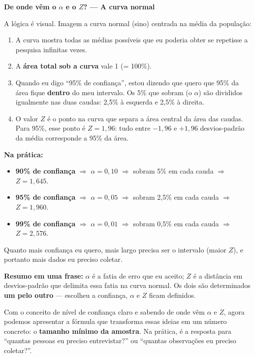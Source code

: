 \begin{SolvedBox}
\textbf{De onde vêm o $\alpha$ e o $Z$? --- A curva normal}

A lógica é visual.
Imagem a curva normal (sino) centrada na média da população:

\begin{enumerate}
  \item A curva mostra todas as médias possíveis que eu poderia obter
  se repetisse a pesquisa infinitas vezes.
  \item A \textbf{área total sob a curva} vale 1 (= 100\%).
  \item Quando eu digo ``95\% de confiança'', estou dizendo que quero
  que 95\% da área fique \textbf{dentro} do meu intervalo. Os 5\% que
  sobram (o $\alpha$) são divididos igualmente nas duas caudas:
  2{,}5\% à esquerda e 2{,}5\% à direita.
  \item O valor \textbf{$Z$} é o ponto na curva que separa a área
  central da área das caudas. Para 95\%, esse ponto é $Z = 1{,}96$:
  tudo entre $-1{,}96$ e $+1{,}96$ desvios-padrão da média corresponde
  a 95\% da área.
\end{enumerate}

\textbf{Na prática:}
\begin{itemize}
  \item \textbf{90\% de confiança} $\Rightarrow$ $\alpha = 0{,}10$
  $\Rightarrow$ sobram 5\% em cada cauda $\Rightarrow$ $Z = 1{,}645$.
  \item \textbf{95\% de confiança} $\Rightarrow$ $\alpha = 0{,}05$
  $\Rightarrow$ sobram 2{,}5\% em cada cauda $\Rightarrow$ $Z = 1{,}960$.
  \item \textbf{99\% de confiança} $\Rightarrow$ $\alpha = 0{,}01$
  $\Rightarrow$ sobram 0{,}5\% em cada cauda $\Rightarrow$ $Z = 2{,}576$.
\end{itemize}

Quanto mais confiança eu quero, mais largo precisa ser o intervalo
(maior $Z$), e portanto mais dados eu preciso coletar.

\textbf{Resumo em uma frase:}
$\alpha$ é a fatia de erro que eu aceito; $Z$ é a distância
em desvios-padrão que delimita essa fatia na curva normal.
Os dois são determinados \textbf{um pelo outro} --- escolheu
a confiança, $\alpha$ e $Z$ ficam definidos.
\end{SolvedBox}

Com o conceito de nível de confiança claro e sabendo de onde vêm $\alpha$
e $Z$, agora podemos apresentar a fórmula que transforma essas ideias
em um número concreto: o \textbf{tamanho mínimo da amostra}.
Na prática, é a resposta para ``quantas pessoas eu preciso entrevistar?''
ou ``quantas observações eu preciso coletar?''.


